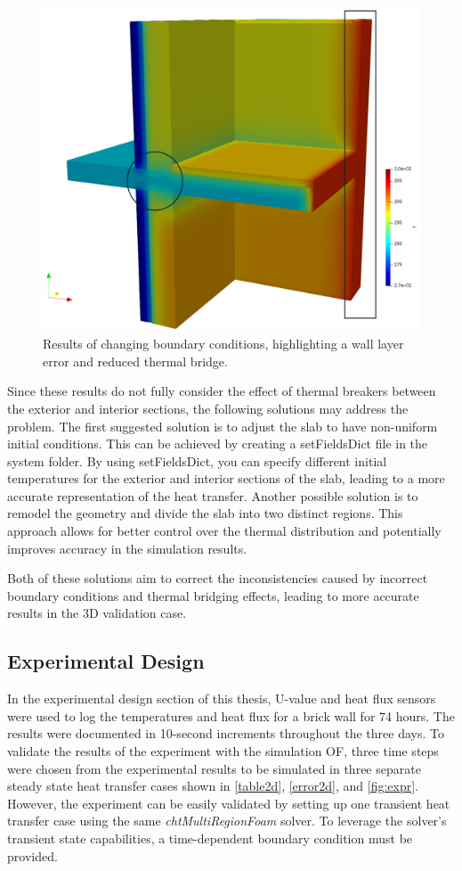 
\begin{figure}[htb]
\centering
\includegraphics[width=0.75\columnwidth]{Figures/maxx.png}
\hspace{0.7cm}
\caption[Slab Validation]{Results of changing boundary conditions, highlighting a wall layer error and reduced thermal bridge.}
\label{maxx}
\end{figure}

Since these results do not fully consider the effect of thermal breakers between the exterior and interior sections, the following solutions may address the problem. The first suggested solution is to adjust the slab to have non-uniform initial conditions. This can be achieved by creating a setFieldsDict file in the system folder. By using setFieldsDict, you can specify different initial temperatures for the exterior and interior sections of the slab, leading to a more accurate representation of the heat transfer. Another possible solution is to remodel the geometry and divide the slab into two distinct regions. This approach allows for better control over the thermal distribution and potentially improves accuracy in the simulation results.

Both of these solutions aim to correct the inconsistencies caused by incorrect boundary conditions and thermal bridging effects, leading to more accurate results in the 3D validation case.

\subsection{Experimental Design}
In the experimental design section of this thesis, U-value and heat flux sensors were used to log the temperatures and heat flux for a brick wall for 74 hours. The results were documented in 10-second increments throughout the three days. To validate the results of the experiment with the simulation \gls{OF}, three time steps were chosen from the experimental results to be simulated in three separate steady state heat transfer cases shown in \ref{table2d}, \ref{error2d}, and \ref{fig:expr}. However, the experiment can be easily validated by setting up one transient heat transfer case using the same \textit{chtMultiRegionFoam} solver. To leverage the solver's transient state capabilities, a time-dependent boundary condition must be provided. 



